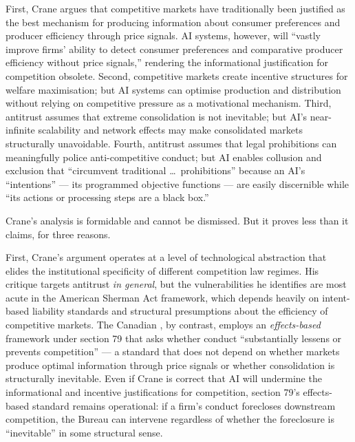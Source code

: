 First, Crane argues that competitive markets have traditionally been justified as the best mechanism for producing information about consumer preferences and producer efficiency through price signals. AI systems, however, will ``vastly improve firms' ability to detect consumer preferences and comparative producer efficiency without price signals,'' rendering the informational justification for competition obsolete. Second, competitive markets create incentive structures for welfare maximisation; but AI systems can optimise production and distribution without relying on competitive pressure as a motivational mechanism. Third, antitrust assumes that extreme consolidation is not inevitable; but AI's near-infinite scalability and network effects may make consolidated markets structurally unavoidable. Fourth, antitrust assumes that legal prohibitions can meaningfully police anti-competitive conduct; but AI enables collusion and exclusion that ``circumvent traditional \ldots\ prohibitions'' because an AI's ``intentions'' --- its programmed objective functions --- are easily discernible while ``its actions or processing steps are a black box.''

Crane's analysis is formidable and cannot be dismissed. But it proves less than it claims, for three reasons.

First, Crane's argument operates at a level of technological abstraction that elides the institutional specificity of different competition law regimes. His critique targets antitrust \textit{in general}, but the vulnerabilities he identifies are most acute in the American Sherman Act framework, which depends heavily on intent-based liability standards and structural presumptions about the efficiency of competitive markets. The Canadian , by contrast, employs an \textit{effects-based} framework under section 79 that asks whether conduct ``substantially lessens or prevents competition'' --- a standard that does not depend on whether markets produce optimal information through price signals or whether consolidation is structurally inevitable. Even if Crane is correct that AI will undermine the informational and incentive justifications for competition, section 79's effects-based standard remains operational: if a firm's conduct forecloses downstream competition, the Bureau can intervene regardless of whether the foreclosure is ``inevitable'' in some structural sense.

